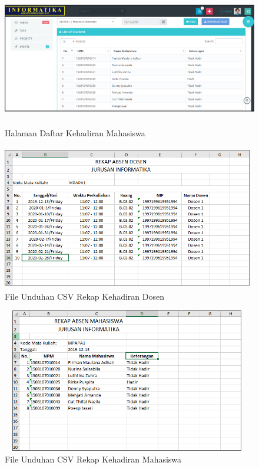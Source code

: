 \begin{enumerate}[a.]
\begin{enumerate}[a.]
	      \vspace{-0.2cm}
	      \begin{figure}[H]
		      \center
		      \includegraphics [width = 13cm, height= 6cm]{gambar/web/dashboard-mahasiswa}
		      \caption{Halaman Daftar Kehadiran Mahasiswa}
		      \label{web-daftar-mahasiswa}
	      \end{figure}

	      \vspace{-0.2cm}
	      \begin{figure}[H]
		      \center
		      \includegraphics [width = 11cm, height= 6.3cm]{gambar/web/rekap-dosen}
		      \caption{File Unduhan CSV Rekap Kehadiran Dosen}
		      \label{web-csv-dosen}
	      \end{figure}

	      \vspace{-0.2cm}
	      \begin{figure}[H]
		      \center
		      \includegraphics [width = 11cm, height= 6.3cm]{gambar/web/rekap-mahasiswa}
		      \caption{File Unduhan CSV Rekap Kehadiran Mahasiswa}
		      \label{web-csv-mahasiswa}
	      \end{figure}


\end{enumerate}
\end{enumerate}
